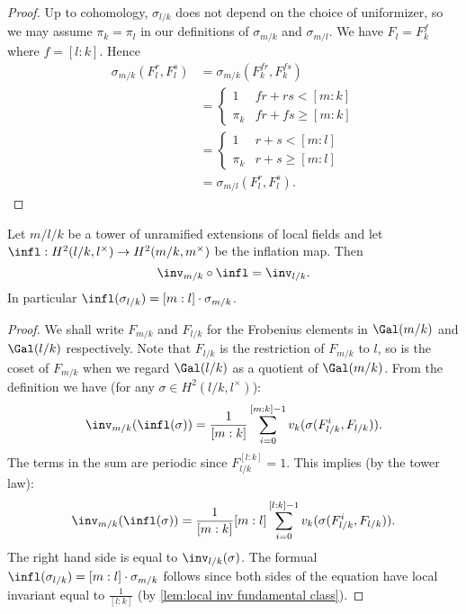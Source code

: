 \begin{proof}
	Up to cohomology, $\sigma_{l/k}$ does not depend on the choice of
	uniformizer, so we may assume $\pi_k=\pi_l$
	in our definitions of $\sigma_{m/k}$ and $\sigma_{m/l}$.
	We have $F_l = F_k^f$ where $f = [l:k]$.
	Hence
	\begin{align*}
		\sigma_{m/k}(F_l^r, F_l^s)
		&=
		\sigma_{m/k}(F_k^{fr}, F_k^{fs})\\
		&=
		\begin{cases}
			1 & fr + rs < [m:k] \\
			\pi_k & fr + fs \ge [m:k]
		\end{cases}\\
		&=
		\begin{cases}
			1 & r + s < [m:l] \\
			\pi_k & r + s \ge [m:l]
		\end{cases}\\
		&=\sigma_{m/l}(F_l^r,F_l^s).
	\end{align*}
\end{proof}



\begin{lemma} \label{lem:local unram inv infl}
	Let $m / l / k$ be a tower of unramified extensions of local fields
	and let $\infl : H^2(l/k,l^\times) \to H^2(m/k,m^\times)$ be the inflation map.
	Then
	\[
		\inv_{m/k} \circ \infl  = \inv_{l/k}.
	\]
	In particular $\infl(\sigma_{l/k}) = [m:l]\cdot \sigma_{m/k}$.
\end{lemma}

\begin{proof}
	We shall write $F_{m/k}$ and $F_{l/k}$ for the Frobenius elements in $\Gal(m/k)$ and
	$\Gal(l/k)$ respectively. Note that $F_{l/k}$ is the restriction of $F_{m/k}$ to $l$,
	so is the coset of $F_{m/k}$ when we regard $\Gal(l/k)$ as a quotient of $\Gal(m/k)$.
	From the definition we have (for any $\sigma \in H^2(l/k,l^\times)$):
	\[
		\inv_{m/k}(\infl(\sigma))
		= \frac{1}{[m:k]}\sum_{i=0}^{[m:k]-1} v_k(\sigma(F_{l/k}^i,F_{l/k})).
	\]
	The terms in the sum are periodic since $F_{l/k}^{[l:k]}=1$.
	This implies (by the tower law):
	\[
		\inv_{m/k}(\infl(\sigma))
		= \frac{1}{[m:k]} [m:l]\sum_{i=0}^{[l:k]-1} v_k(\sigma(F_{l/k}^i,F_{l/k})).
	\]
	The right hand side is equal to $\inv_{l/k}(\sigma)$.
	The formual $\infl(\sigma_{l/k}) = [m:l]\cdot \sigma_{m/k}$ follows since both sides of the
	equation have local invariant equal to $\frac{1}{[l:k]}$
	(by \ref{lem:local inv fundamental class}).
\end{proof}






